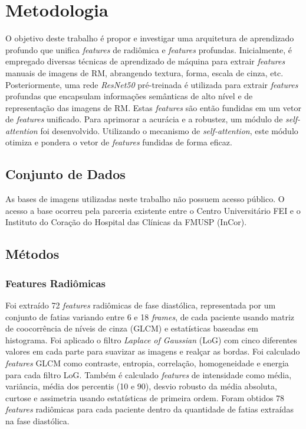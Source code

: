 \chapter{Metodologia} 
\label{chap:metodologia}

O objetivo deste trabalho é propor e investigar uma arquitetura de aprendizado profundo que unifica \textit{features} de radiômica e \textit{features} profundas. Inicialmente, é empregado diversas técnicas de aprendizado de máquina para extrair \textit{features} manuais de imagens de RM, abrangendo textura, forma, escala de cinza, etc. Posteriormente, uma rede \textit{ResNet50} pré-treinada é utilizada para extrair \textit{features} profundas que encapsulam informações semânticas de alto nível e de representação das imagens de RM. Estas \textit{features} são então fundidas em um vetor de \textit{features} unificado. Para aprimorar a acurácia e a robustez, um módulo de \textit{self-attention} foi desenvolvido. Utilizando o mecanismo de \textit{self-attention}, este módulo otimiza e pondera o vetor de \textit{features} fundidas de forma eficaz.

\section{Conjunto de Dados}
As bases de imagens utilizadas neste trabalho não possuem acesso público. O acesso
a base ocorreu pela parceria existente entre o Centro Universitário FEI e o Instituto do Coração do Hospital das Clínicas da FMUSP (InCor).

\section{Métodos}
\label{sec:cap4_metodos}

\subsection{Features Radiômicas}
\label{subsec:cap4_features_radiomicas}

Foi extraído 72 \textit{features} radiômicas de fase diastólica, representada por um conjunto de fatias variando entre 6 e 18 \textit{frames}, de cada paciente usando matriz de coocorrência de níveis de cinza (GLCM) e estatísticas baseadas em histograma. Foi aplicado o filtro \textit{Laplace of Gaussian} (LoG) com cinco diferentes valores em cada parte para suavizar as imagens e realçar as bordas. Foi calculado \textit{features} GLCM como contraste, entropia, correlação, homogeneidade e energia para cada filtro LoG. Também é calculado \textit{features} de intensidade como média, variância, média dos percentis (10 e 90), desvio robusto da média absoluta, curtose e assimetria usando estatísticas de primeira ordem. Foram obtidos 78 \textit{features} radiômicas para cada paciente dentro da quantidade de fatias extraídas na fase diastólica.

